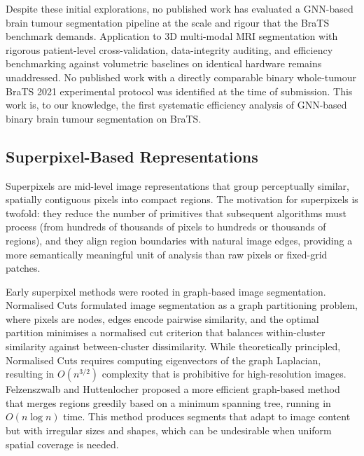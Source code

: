 \documentclass{article}
\begin{document}
Despite these initial explorations, no published work has evaluated a
GNN-based brain tumour segmentation pipeline at the scale and rigour that the
BraTS benchmark demands. Application to 3D multi-modal MRI segmentation with
rigorous patient-level cross-validation, data-integrity auditing, and efficiency
benchmarking against volumetric baselines on identical hardware remains
unaddressed. No published work with a directly comparable binary whole-tumour
BraTS 2021 experimental protocol was identified at the time of submission.
This work is, to our knowledge, the first systematic efficiency analysis of
GNN-based binary brain tumour segmentation on BraTS.

\subsection{Superpixel-Based Representations}

Superpixels are mid-level image representations that group perceptually similar,
spatially contiguous pixels into compact regions. The motivation for superpixels
is twofold: they reduce the number of primitives that subsequent algorithms must
process (from hundreds of thousands of pixels to hundreds or thousands of
regions), and they align region boundaries with natural image edges, providing a
more semantically meaningful unit of analysis than raw pixels or fixed-grid
patches.

Early superpixel methods were rooted in graph-based image segmentation.
Normalised Cuts \cite{shi2000normalized} formulated image segmentation as a
graph partitioning problem, where pixels are nodes, edges encode pairwise
similarity, and the optimal partition minimises a normalised cut criterion that
balances within-cluster similarity against between-cluster dissimilarity. While
theoretically principled, Normalised Cuts requires computing eigenvectors of
the graph Laplacian, resulting in $O(n^{3/2})$ complexity that is prohibitive
for high-resolution images. Felzenszwalb and Huttenlocher
\cite{felzenszwalb2004efficient} proposed a more efficient graph-based method
that merges regions greedily based on a minimum spanning tree, running in
$O(n \log n)$ time. This method produces segments that adapt to image content
but with irregular sizes and shapes, which can be undesirable when uniform
spatial coverage is needed.
\end{document}
